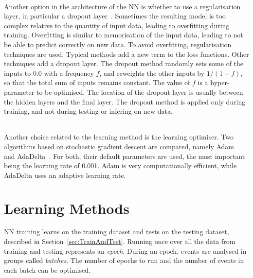 \ \\Another option in the architecture of the NN is whether to use a regularisation layer, in particular a dropout layer~\cite{DropoutLayer}. Sometimes the resulting model is too complex relative to the quantity of input data, leading to overfitting during training. Overfitting is similar to memorisation of the input data, leading to not be able to predict correctly on new data. To avoid overfitting, regularisation techniques are used. Typical methods add a new term to the loss functions. Other techniques add a dropout layer. The dropout method randomly sets some of the inputs to 0.0 with a frequency $f$, and reweights the other inputs by $1/(1-f)$, so that the total sum of inputs remains constant. The value of $f$ is a hyper-parameter to be optimised. The location of the dropout layer is usually between the hidden layers and the final layer. The dropout method is applied only during training, and not during testing or infering on new data.

\ \\Another choice related to the learning method is the learning optimiser. Two algorithms based on stochastic gradient descent are compared, namely Adam~\cite{Adam} and AdaDelta~\cite{AdaDelta}. For both, their default parameters are used, the most important being the learning rate of 0.001. Adam is very computationally efficient, while AdaDelta uses an adaptive learning rate. 

\section{Learning Methods}

NN training learns on the training dataset and tests on the testing dataset, described in Section~\ref{sec:TrainAndTest}. Running once over all the data from training and testing represents an \emph{epoch}. During an epoch, events are analysed in groups called \emph{batches}. The number of epochs to run and the number of events in each batch can be optimised.


